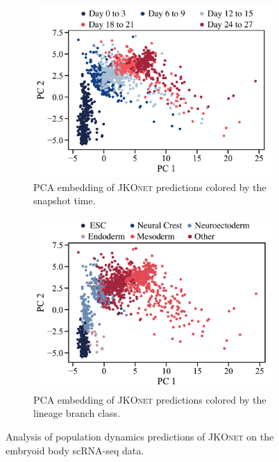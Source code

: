 \begin{figure}[t]
     \begin{subfigure}[t]{0.45\textwidth}
         \centering
         \includegraphics[width=\textwidth]{figures/fig_implicit_moon_pred_days.pdf}
         \caption{PCA embedding of \textsc{JKOnet} predictions colored by the snapshot time.}
     \end{subfigure}
     \hfill
     \begin{subfigure}[t]{0.45\textwidth}
         \centering
         \includegraphics[width=\textwidth]{figures/fig_implicit_moon_pred_Branches.pdf}
         \caption{PCA embedding of \textsc{JKOnet} predictions colored by the lineage branch class.}
     \end{subfigure}
	 \caption{Analysis of population dynamics predictions of \textsc{JKOnet} on the embryoid body scRNA-seq data.}
	 \label{fig:exp_jkonet_cell}
\end{figure}

